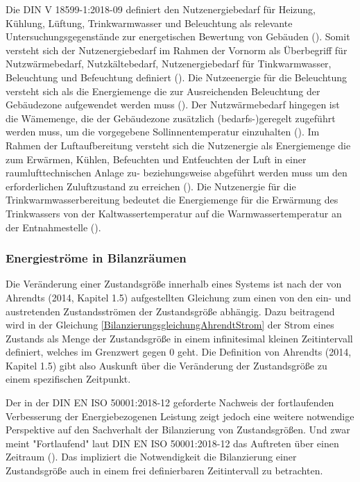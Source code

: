 Die DIN V 18599-1:2018-09 definiert den Nutzenergiebedarf für Heizung, Kühlung, Lüftung, Trinkwarmwasser und Beleuchtung als relevante Untersuchungsgegenstände 
zur energetischen Bewertung von Gebäuden (\cite{DIN18599.2018}). 
Somit versteht sich der Nutzenergiebedarf im Rahmen der Vornorm als Überbegriff für Nutzwärmebedarf, Nutzkältebedarf, Nutzenergiebedarf für Tinkwarmwasser, Beleuchtung und 
Befeuchtung definiert (\cite[Kapitel 3.1.3]{DIN18599.2018}).
Die Nutzeenergie für die Beleuchtung versteht sich als die Energiemenge die zur Ausreichenden Beleuchtung der Gebäudezone aufgewendet werden muss (\cite[Kapitel 5.3.1]{DIN18599.2018}).
Der Nutzwärmebedarf hingegen ist die Wämemenge, die der Gebäudezone zusätzlich (bedarfs-)geregelt zugeführt werden muss, um die vorgegebene 
Sollinnentemperatur einzuhalten (\cite[Kapitel 5.3.1]{DIN18599.2018}).
Im Rahmen der Luftaufbereitung versteht sich die Nutzenergie als Energiemenge die zum Erwärmen, Kühlen, Befeuchten und Entfeuchten der Luft in einer 
raumlufttechnischen Anlage zu- beziehungsweise abgeführt werden muss um den erforderlichen Zuluftzustand zu erreichen (\cite[Kapitel 5.3.1]{DIN18599.2018}).
Die Nutzenergie für die Trinkwarmwasserbereitung bedeutet die Energiemenge für die Erwärmung des Trinkwassers von der Kaltwassertemperatur auf die 
Warmwassertemperatur an der Entnahmestelle (\cite[Kapitel 5.3.1]{DIN18599.2018}).


\subsubsection{Energieströme in Bilanzräumen}
Die Veränderung einer Zustandsgröße innerhalb eines Systems ist nach der von Ahrendts (2014, Kapitel 1.5) aufgestellten Gleichung zum einen  
von den ein- und austretenden Zustandsströmen der Zustandsgröße abhängig. Dazu beitragend wird in der Gleichung \eqref{BilanzierungsgleichungAhrendtStrom}
der Strom eines Zustands als Menge der Zustandsgröße in einem infinitesimal kleinen Zeitintervall definiert, welches im Grenzwert gegen 0 geht. 
Die Definition von Ahrendts (2014, Kapitel 1.5) gibt also Auskunft über die Veränderung der Zustandsgröße zu einem spezifischen Zeitpunkt.

Der in der DIN EN ISO 50001:2018-12 geforderte Nachweis der fortlaufenden Verbesserung der Energiebezogenen Leistung zeigt jedoch eine weitere notwendige Perspektive 
auf den Sachverhalt der Bilanzierung von Zustandsgrößen. Und zwar meint "Fortlaufend" laut DIN EN ISO 50001:2018-12 das Auftreten über einen Zeitraum (\cite[S. 38]{DIN50001.2018}). 
Das impliziert die Notwendigkeit die Bilanzierung einer Zustandsgröße auch in einem frei definierbaren Zeitintervall zu betrachten. 

